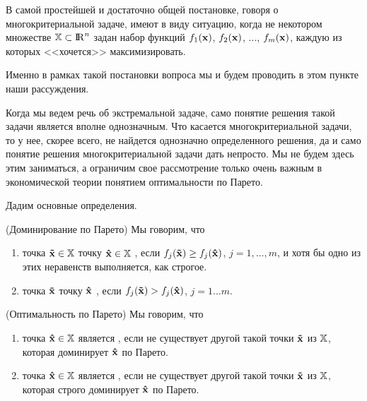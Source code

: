     В самой простейшей и достаточно общей постановке, говоря о многокритериальной задаче,
    имеют в виду ситуацию, когда не некотором множестве $\mathbb{X} \subset {\rm I\!R}^n$ задан набор
    функций $f_1(\mathbf{x})$, $f_2(\mathbf{x})$, ..., $f_m(\mathbf{x})$, каждую из которых <<хочется>>
    максимизировать.

    Именно в рамках такой постановки вопроса мы и будем проводить в этом
    пункте наши рассуждения.

    Когда мы ведем речь об экстремальной задаче, само понятие решения такой задачи является
    вполне однозначным. Что касается многокритериальной задачи, то у нее, скорее всего, не
    найдется однозначно определенного решения, да и само понятие решения многокритериальной
    задачи дать непросто. Мы не будем здесь этим заниматься, а ограничим свое рассмотрение
    только очень важным в экономической теории понятием оптимальности по Парето.

    Дадим основные определения.



\begin{dfn}(Доминирование по Парето) Мы говорим, что

\begin{enumerate}
\item точка $\mathbf{\tilde x} \in \mathbb{X}$  точку
$\mathbf{\hat x} \in \mathbb{X}$ , если $f_j(\mathbf{\tilde x})
\geq f_j(\mathbf{\hat x})$, $j=1,\ldots,m$, и хотя бы одно из этих
неравенств выполняется, как строгое.

\item  точка $\mathbf{\tilde x}$  точку
$\mathbf{\hat x}$ , если $f_j(\mathbf{\tilde x}) >
f_j(\mathbf{\hat x})$, $j=1 \ldots m$.
\end{enumerate}
\end{dfn}

\begin{dfn}(Оптимальность по Парето) Мы говорим, что

\begin{enumerate}

\item точка $\mathbf{\hat x} \in \mathbb{X}$ является , если не существует другой такой точки $\mathbf{\tilde x}$ из
$\mathbb{X}$, которая доминирует $\mathbf{\hat x}$ по Парето.

\item точка $\mathbf{\hat x} \in \mathbb{X}$ является , если не существует другой такой точки
$\mathbf{\tilde x}$ из $\mathbb{X}$, которая строго доминирует $\mathbf{\hat x}$
по Парето.

\end{enumerate}
\end{dfn}


